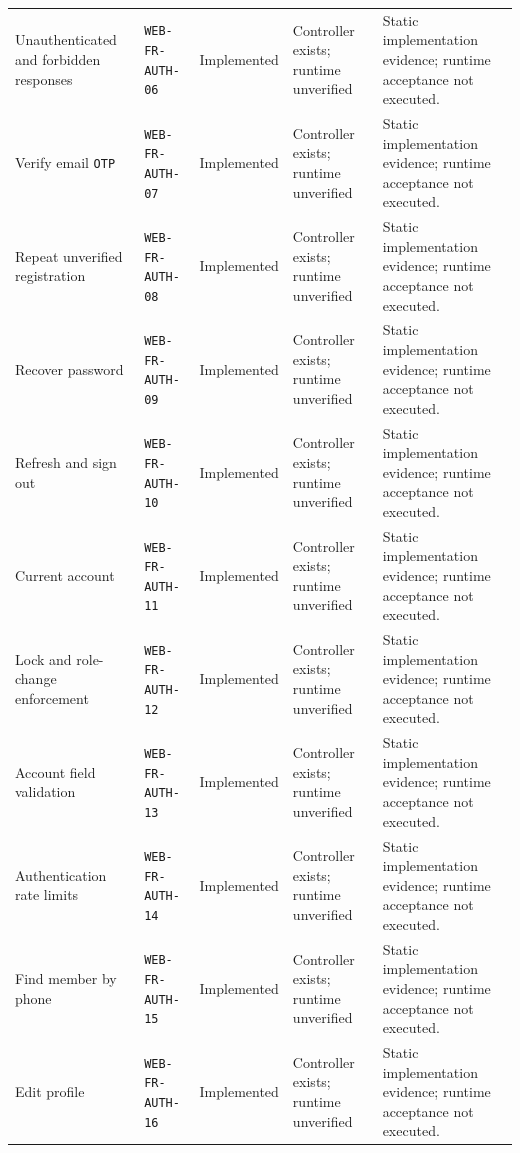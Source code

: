 \begin{longtable}{@{}P{0.19000\SRSWidth}P{0.18000\SRSWidth}P{0.15000\SRSWidth}P{0.20000\SRSWidth}P{0.28000\SRSWidth}@{}}
Unauthenticated and forbidden responses & \texttt{WEB-\allowbreak{}FR-\allowbreak{}AUTH-\allowbreak{}06} & Implemented & Controller exists; runtime unverified & Static implementation evidence; runtime acceptance not executed. \\[3pt]
Verify email \texttt{OTP} & \texttt{WEB-\allowbreak{}FR-\allowbreak{}AUTH-\allowbreak{}07} & Implemented & Controller exists; runtime unverified & Static implementation evidence; runtime acceptance not executed. \\[3pt]
Repeat unverified registration & \texttt{WEB-\allowbreak{}FR-\allowbreak{}AUTH-\allowbreak{}08} & Implemented & Controller exists; runtime unverified & Static implementation evidence; runtime acceptance not executed. \\[3pt]
Recover password & \texttt{WEB-\allowbreak{}FR-\allowbreak{}AUTH-\allowbreak{}09} & Implemented & Controller exists; runtime unverified & Static implementation evidence; runtime acceptance not executed. \\[3pt]
Refresh and sign out & \texttt{WEB-\allowbreak{}FR-\allowbreak{}AUTH-\allowbreak{}10} & Implemented & Controller exists; runtime unverified & Static implementation evidence; runtime acceptance not executed. \\[3pt]
Current account & \texttt{WEB-\allowbreak{}FR-\allowbreak{}AUTH-\allowbreak{}11} & Implemented & Controller exists; runtime unverified & Static implementation evidence; runtime acceptance not executed. \\[3pt]
Lock and role-change enforcement & \texttt{WEB-\allowbreak{}FR-\allowbreak{}AUTH-\allowbreak{}12} & Implemented & Controller exists; runtime unverified & Static implementation evidence; runtime acceptance not executed. \\[3pt]
Account field validation & \texttt{WEB-\allowbreak{}FR-\allowbreak{}AUTH-\allowbreak{}13} & Implemented & Controller exists; runtime unverified & Static implementation evidence; runtime acceptance not executed. \\[3pt]
Authentication rate limits & \texttt{WEB-\allowbreak{}FR-\allowbreak{}AUTH-\allowbreak{}14} & Implemented & Controller exists; runtime unverified & Static implementation evidence; runtime acceptance not executed. \\[3pt]
Find member by phone & \texttt{WEB-\allowbreak{}FR-\allowbreak{}AUTH-\allowbreak{}15} & Implemented & Controller exists; runtime unverified & Static implementation evidence; runtime acceptance not executed. \\[3pt]
Edit profile & \texttt{WEB-\allowbreak{}FR-\allowbreak{}AUTH-\allowbreak{}16} & Implemented & Controller exists; runtime unverified & Static implementation evidence; runtime acceptance not executed. \\[3pt]

\end{longtable}
